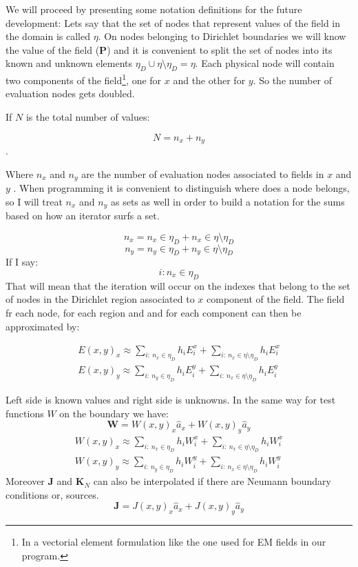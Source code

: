 We will proceed by presenting some notation definitions for the future development:
Lets say that the set of nodes that represent values of the field in the domain is called $\eta$. On nodes belonging to Dirichlet boundaries we will know the value of the field ($\mathbf{P}$) and it is convenient to split the set of nodes into its known and unknown elements $\eta_D\cup\eta\setminus\eta_D=\eta$.  Each physical node will contain two components of the field\footnote{In a vectorial element formulation like the one used for EM fields in our program.}, one for $x$ and the other for $y$. So the number of evaluation nodes gets doubled.

If $N$ is the total number of values:

$$N = n_x+ n_y$$.

Where $n_x$ and $n_y$ are the number of evaluation nodes associated to fields in $x$ and  $y$	. When programming it is convenient to distinguish where does a node belongs, so I will treat $n_x$ and $n_y$ as sets as well in order to build a notation for the sums based on  how an iterator surfs a set.

$$n_x = n_x \in \eta_D + n_x \in \eta\setminus\eta_D $$
$$n_y = n_y \in \eta_D + n_y \in \eta\setminus\eta_D $$
If I say: $$i: n_x\in \eta_D$$  That will mean that the iteration will occur on the indexes that belong to the set of nodes in the Dirichlet region associated to $x$ component of the field. The field fr each node, for each region and and for each component can then be approximated by:

\begin{align*}
E(x,y)_x\approx \sum_{i:\ n_x \in \eta_D} h_i E_i^x+\sum_{i:\ n_x \in \eta\setminus\eta_D} h_i E_i^x \\
E(x,y)_y\approx \sum_{i:\ n_y \in \eta_D}h_iE_i^y+
\sum_{i:\ n_x \in \eta\setminus\eta_D}h_iE_i^y
\end{align*}
 
Left side is known values and right side is unknowns.
In the same way for test functions $W$ on the boundary we have: 
$$\mathbf{W}=W(x,y)_x\hat{a}_x + W(x,y)_y \hat{a}_y $$
\begin{align*}
W(x,y)_x\approx \sum_{i:\ n_x \in \eta_D} h_i W_i^x+\sum_{i:\ n_x \in \eta\setminus\eta_D} h_i W_i^x \\
W(x,y)_y\approx \sum_{i:\ n_y \in \eta_D}h_iW_i^y+
\sum_{i:\ n_x \in \eta\setminus\eta_D}h_iW_i^y
\end{align*}
Moreover $\mathbf{J}$ and $\mathbf{K}_N$ can also be interpolated if there are Neumann boundary conditions or, sources. 
$$\mathbf{J}=J(x,y)_x\hat{a}_x + J(x,y)_y \hat{a}_y $$


